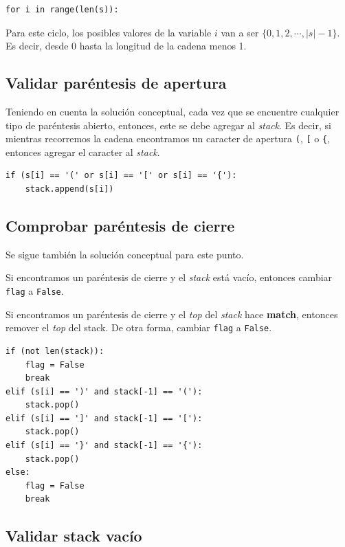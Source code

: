 \documentclass{article}
\begin{document}
\begin{lstlisting}[style=pythonstyle]
for i in range(len(s)):
\end{lstlisting}

Para este ciclo, los posibles valores de la variable \(i\) van a ser \( \{0, 1, 2, \cdots, \lvert s \rvert - 1 \}\). Es decir, desde 0 hasta la longitud de la cadena menos 1.

\subsection{Validar paréntesis de apertura}

Teniendo en cuenta la solución conceptual, cada vez que se encuentre cualquier tipo de paréntesis abierto, entonces, este se debe agregar al \textit{stack}. Es decir, si mientras recorremos la cadena encontramos un caracter de apertura \texttt{(}, \texttt{[} o \texttt{\{}, entonces agregar el caracter al \textit{stack}.

\begin{lstlisting}[style=pythonstyle]
if (s[i] == '(' or s[i] == '[' or s[i] == '{'):
    stack.append(s[i])
\end{lstlisting}

\subsection{Comprobar paréntesis de cierre}

Se sigue también la solución conceptual para este punto.

Si encontramos un paréntesis de cierre y el \textit{stack} está vacío, entonces cambiar \texttt{flag} a \lstinline[style=pythonstyle]{False}.

Si encontramos un paréntesis de cierre y el \textit{top} del \textit{stack} hace \textbf{match}, entonces remover el \textit{top} del stack. De otra forma, cambiar \texttt{flag} a \lstinline[style=pythonstyle]{False}.

\begin{lstlisting}[style=pythonstyle]
if (not len(stack)):
    flag = False
    break
elif (s[i] == ')' and stack[-1] == '('):
    stack.pop()
elif (s[i] == ']' and stack[-1] == '['):
    stack.pop()
elif (s[i] == '}' and stack[-1] == '{'):
    stack.pop()
else:
    flag = False
    break
\end{lstlisting}

\subsection{Validar stack vacío}
\end{document}
